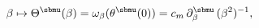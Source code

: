 \begin{equation} \label{parameters}
\beta \mapsto \Theta^\sbmu (\beta) = 
\omega_\beta (\theta^\sbmu (0) )
= c_m \,\partial_\beta^\sbmu \, (\beta^{2})^{-1},
\end{equation}

